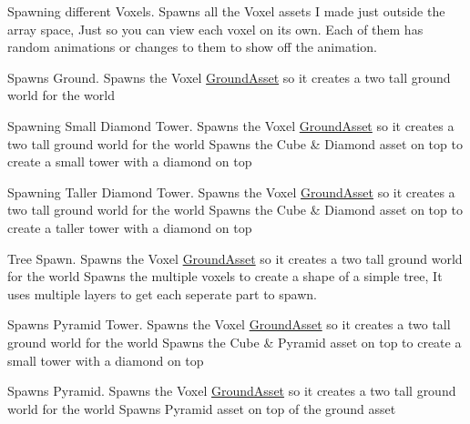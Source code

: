 Spawning different Voxels. Spawns all the Voxel assets I made just outside the array space, Just so you can view each voxel on it\textquotesingle{}s own. Each of them has random animations or changes to them to show off the animation.

Spawns Ground. Spawns the Voxel \hyperlink{class_ground_asset}{Ground\+Asset} so it creates a two tall ground world for the world

Spawning Small Diamond Tower. Spawns the Voxel \hyperlink{class_ground_asset}{Ground\+Asset} so it creates a two tall ground world for the world Spawns the Cube \& Diamond asset on top to create a small tower with a diamond on top

Spawning Taller Diamond Tower. Spawns the Voxel \hyperlink{class_ground_asset}{Ground\+Asset} so it creates a two tall ground world for the world Spawns the Cube \& Diamond asset on top to create a taller tower with a diamond on top

Tree Spawn. Spawns the Voxel \hyperlink{class_ground_asset}{Ground\+Asset} so it creates a two tall ground world for the world Spawns the multiple voxels to create a shape of a simple tree, It uses multiple layers to get each seperate part to spawn.

Spawns Pyramid Tower. Spawns the Voxel \hyperlink{class_ground_asset}{Ground\+Asset} so it creates a two tall ground world for the world Spawns the Cube \& Pyramid asset on top to create a small tower with a diamond on top

Spawns Pyramid. Spawns the Voxel \hyperlink{class_ground_asset}{Ground\+Asset} so it creates a two tall ground world for the world Spawns Pyramid asset on top of the ground asset

